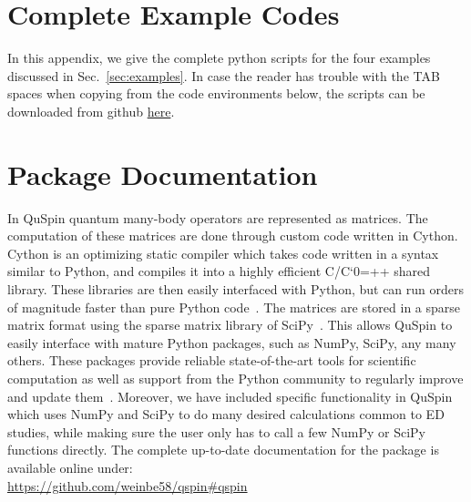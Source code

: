 \documentclass{SciPost}
\newcommand\0{\scalebox{-1}[1]{0}}
\let\svttfamily\ttfamily
\renewcommand\ttfamily{\svttfamily\catcode`0=\active }
\renewcommand\texttt{\bgroup\ttfamily\texttthelp}
\def\texttthelp#1{#1\egroup}
\begin{document}
\begin{appendix}
\newpage
\section{Complete Example Codes}
\label{app:scripts}

In this appendix, we give the complete python scripts for the four examples discussed in Sec.~\ref{sec:examples}. In case the reader has trouble with the TAB spaces when copying from the code environments below, the scripts can be downloaded from github \href{https://github.com/weinbe58/qspin_paper/tree/master/scripts}{here}.


\newpage

\newpage

\newpage



\section{Package Documentation}
\label{app:doc}
In QuSpin quantum many-body operators are represented as matrices. The computation of these matrices are done through custom code written in Cython. Cython is an optimizing static compiler which takes code written in a syntax similar to Python, and compiles it into a highly efficient C/C\texttt{++} shared library. These libraries are then easily interfaced with Python, but can run orders of magnitude faster than pure Python code~\cite{Cython}. The matrices are stored in a sparse matrix format using the sparse matrix library of SciPy~\cite{SciPy_package}. This allows QuSpin to easily interface with mature Python packages, such as NumPy, SciPy, any many others. These packages provide reliable state-of-the-art tools for scientific computation as well as support from the Python community to regularly improve and update them~\cite{NumPy,Python_computing_1,Python_computing_2,SciPy_package}. Moreover, we have included specific functionality in QuSpin which uses NumPy and SciPy to do many desired calculations common to ED studies, while making sure the user only has to call a few NumPy or SciPy functions directly. The complete up-to-date documentation for the package is available online under:\\

\href{https://github.com/weinbe58/qspin\#qspin}{https://github.com/weinbe58/qspin\#qspin}\\

\end{appendix}
\end{document}
